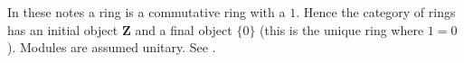 In these notes a ring is a commutative ring with a $1$. Hence the
category of rings has an initial object $\mathbf{Z}$ and a final
object $\{0\}$ (this is the unique ring where $1 = 0$). Modules are
assumed unitary. See \cite{Eisenbud}.
